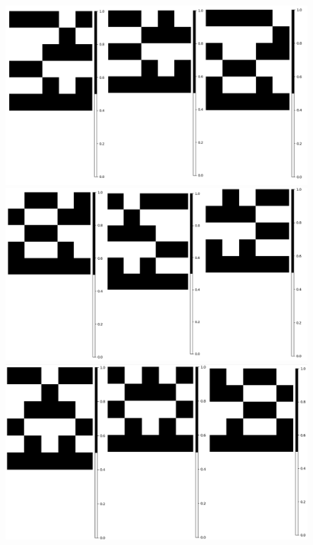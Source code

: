\documentclass[11pt]{article}
\begin{document}
			\begin{figure}[H]
			\centering
			\includegraphics[scale=0.3]{resources/Atractores54/atractor_54_size_5_res.png}
			\includegraphics[scale=0.3]{resources/Atractores54/atractor_54_size_5_res1.png}
			\includegraphics[scale=0.3]{resources/Atractores54/atractor_54_size_5_res2.png}

\end{figure}
\end{document}
